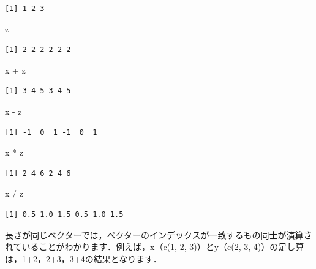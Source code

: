 \documentclass[
  letterpaper,
  DIV=11,
  numbers=noendperiod]{scrreprt}
\newenvironment{Shaded}{\begin{snugshade}}{\end{snugshade}}
\newcommand{\NormalTok}[1]{\textcolor[rgb]{0.00,0.23,0.31}{#1}}
\newcommand{\SpecialCharTok}[1]{\textcolor[rgb]{0.37,0.37,0.37}{#1}}
\begin{document}
\begin{verbatim}
[1] 1 2 3
\end{verbatim}

\begin{Shaded}
\begin{Highlighting}[]
\NormalTok{z}
\end{Highlighting}
\end{Shaded}

\begin{verbatim}
[1] 2 2 2 2 2 2
\end{verbatim}

\begin{Shaded}
\begin{Highlighting}[]
\NormalTok{x }\SpecialCharTok{+}\NormalTok{ z}
\end{Highlighting}
\end{Shaded}

\begin{verbatim}
[1] 3 4 5 3 4 5
\end{verbatim}

\begin{Shaded}
\begin{Highlighting}[]
\NormalTok{x }\SpecialCharTok{{-}}\NormalTok{ z}
\end{Highlighting}
\end{Shaded}

\begin{verbatim}
[1] -1  0  1 -1  0  1
\end{verbatim}

\begin{Shaded}
\begin{Highlighting}[]
\NormalTok{x }\SpecialCharTok{*}\NormalTok{ z}
\end{Highlighting}
\end{Shaded}

\begin{verbatim}
[1] 2 4 6 2 4 6
\end{verbatim}

\begin{Shaded}
\begin{Highlighting}[]
\NormalTok{x }\SpecialCharTok{/}\NormalTok{ z}
\end{Highlighting}
\end{Shaded}

\begin{verbatim}
[1] 0.5 1.0 1.5 0.5 1.0 1.5
\end{verbatim}

長さが同じベクターでは，ベクターのインデックスが一致するもの同士が演算されていることがわかります．例えば，x（c(1,
2, 3)）とy（c(2, 3, 4)）の足し算は，1+2，2+3，3+4の結果となります．
\end{document}
